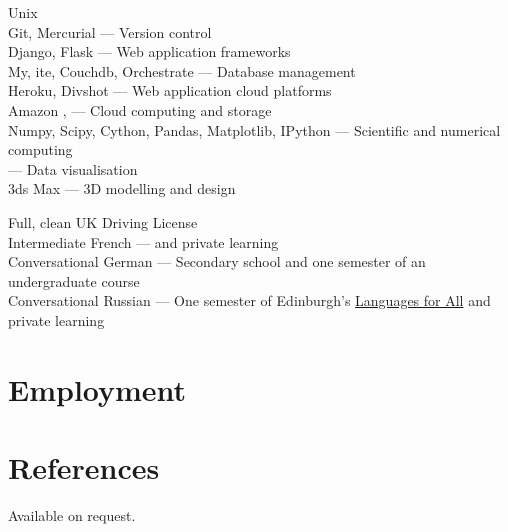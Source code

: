 \documentclass[10pt]{article}
\begin{document}
        {
            Unix\\
            Git, Mercurial --- Version control\\
            Django, Flask --- Web application frameworks\\
            My, ite, Couchdb, Orchestrate --- Database management\\
            Heroku, Divshot --- Web application cloud platforms\\
            Amazon ,  --- Cloud computing and storage\\
            Numpy, Scipy, Cython, Pandas, Matplotlib, IPython --- Scientific and numerical computing\\
             --- Data visualisation\\
            3ds Max --- 3D modelling and design
        }


        {
            Full, clean UK Driving License\\
            Intermediate French ---   and private learning\\
            Conversational German --- Secondary school and one semester of an undergraduate course\\
            Conversational Russian --- One semester of Edinburgh's \href{http://www.ed.ac.uk/studying/short-courses/languages/for-all}{Languages for All} and private learning
        }

    \section{Employment}




    \section{References}

        Available on request.
\end{document}

